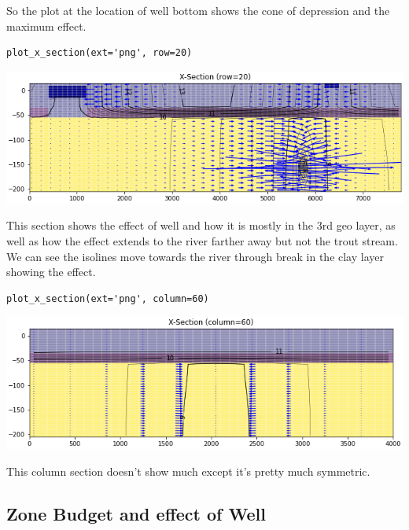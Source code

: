 \documentclass[titlepage,12pt]{unisubmission}
\begin{document}
So the plot at the location of well bottom shows the cone of depression and the maximum effect.

\begin{verbatim}
plot_x_section(ext='png', row=20)
\end{verbatim}

\begin{center}
\begin{center}
\includegraphics[width=.9\linewidth]{./images/3_section_row-20.png}
\end{center}
\end{center}

This section shows the effect of well and how it is mostly in the 3rd geo layer, as well as how the effect extends to the river farther away but not the trout stream. We can see the isolines move towards the river through break in the clay layer showing the effect.

\begin{verbatim}
plot_x_section(ext='png', column=60)
\end{verbatim}

\begin{center}
\begin{center}
\includegraphics[width=.9\linewidth]{./images/3_section_column-60.png}
\end{center}
\end{center}

This column section doesn't show much except it's pretty much symmetric.

\subsection{Zone Budget and effect of Well}
\label{sec:org8967229}
\end{document}
